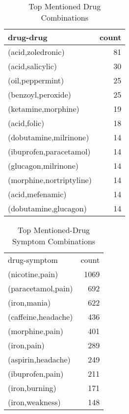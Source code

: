 \documentclass[letterpaper]{article}
\begin{document}
\begin{table}
\centering
\begin{tabular}{lr}
\hline
drug-drug & count \\
\hline
(acid,zoledronic) & 81\\
(acid,salicylic) & 30\\
(oil,peppermint) & 25\\
(benzoyl,peroxide) & 25\\
(ketamine,morphine) & 19\\
(acid,folic) & 18\\
(dobutamine,milrinone) & 14\\
(ibuprofen,paracetamol) & 14\\
(glucagon,milrinone) & 14\\
(morphine,nortriptyline) & 14\\
(acid,mefenamic) & 14\\
(dobutamine,glucagon) & 14\\
\hline
\end{tabular}
\caption{\label{TabcoDrugCount} Top Mentioned Drug Combinations}
\end{table}

\begin{table}
\centering
\begin{tabular}{lr}
\hline
\hline
drug-symptom & count \\
(nicotine,pain) & 1069\\
(paracetamol,pain) & 692\\
(iron,mania) & 622\\
(caffeine,headache) & 436\\
(morphine,pain) & 401\\
(iron,pain) & 289\\
(aspirin,headache) & 249\\
(ibuprofen,pain) & 211\\
(iron,burning) & 171\\
(iron,weakness) & 148\\
\hline
\end{tabular}
\caption{\label{TabcoDrugSymptomCount} Top Mentioned-Drug Symptom Combinations}
\end{table}
\end{document}

